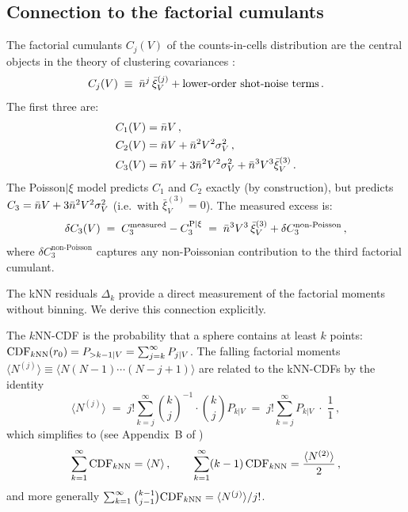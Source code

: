 \subsection{Connection to the factorial cumulants}
\label{sec:factorial_cumulants}

The factorial cumulants $C_j(V)$ of the counts-in-cells distribution are the central objects in the theory of clustering covariances \citep{Szapudi1998}:
\begin{equation}
  C_j(V) \;\equiv\; \bar{n}^j\,\bar{\xi}^{(j)}_V + \text{lower-order shot-noise terms}\,.
  \label{eq:factorial_cumulant}
\end{equation}
The first three are:
\begin{align}
  C_1(V) &= \bar{n} V\,,\label{eq:C1}\\
  C_2(V) &= \bar{n} V + \bar{n}^2 V^2 \sigma_V^2\,,\label{eq:C2}\\
  C_3(V) &= \bar{n} V + 3\bar{n}^2 V^2 \sigma_V^2 + \bar{n}^3 V^3 \bar{\xi}^{(3)}_V\,.\label{eq:C3}
\end{align}
The Poisson$|\xi$ model predicts $C_1$ and $C_2$ exactly (by construction), but predicts $C_3 = \bar{n} V + 3\bar{n}^2 V^2 \sigma_V^2$ (i.e.\ with $\bar{\xi}^{(3)}_V = 0$).  The measured excess is:
\begin{equation}
  \delta C_3(V) \;=\; C_3^{\mathrm{measured}} - C_3^{\mathrm{P}|\xi} \;=\; \bar{n}^3 V^3\,\bar{\xi}^{(3)}_V + \delta C_3^{\mathrm{non\text{-}Poisson}}\,,
  \label{eq:delta_C3}
\end{equation}
where $\delta C_3^{\mathrm{non\text{-}Poisson}}$ captures any non-Poissonian contribution to the third factorial cumulant.

The kNN residuals $\Delta_k$ provide a direct measurement of the factorial moments without binning.  We derive this connection explicitly.

The $k$NN-CDF is the probability that a sphere contains at least $k$ points: $\mathrm{CDF}_{k\mathrm{NN}}(r_0) = P_{>k-1|V} = \sum_{j=k}^{\infty} P_{j|V}$.  The falling factorial moments $\langle N^{(j)} \rangle \equiv \langle N(N-1)\cdots(N-j+1)\rangle$ are related to the kNN-CDFs by the identity
\begin{equation}
  \langle N^{(j)} \rangle \;=\; j!\sum_{k=j}^{\infty} \binom{k}{j}^{-1}\!\cdot\! \binom{k}{j} P_{k|V} \;=\; j!\sum_{k=j}^{\infty} P_{k|V} \;\cdot\; \frac{1}{1}\,,
\end{equation}
which simplifies to (see Appendix~B of \citealt{Banerjee2020})
\begin{equation}
  \sum_{k=1}^{\infty} \mathrm{CDF}_{k\mathrm{NN}} = \langle N \rangle\,,\qquad \sum_{k=1}^{\infty} (k-1)\,\mathrm{CDF}_{k\mathrm{NN}} = \frac{\langle N^{(2)}\rangle}{2}\,,
  \label{eq:cdf_moment_identity}
\end{equation}
and more generally $\sum_{k=1}^{\infty}\binom{k-1}{j-1}\mathrm{CDF}_{k\mathrm{NN}} = \langle N^{(j)}\rangle / j!$.

